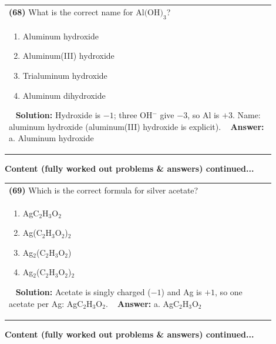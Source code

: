 \documentclass{article}
\begin{document}
\begin{tabular}{|p{0.9\linewidth}|}
\hline
\vspace{0.2cm}
\textbf{(68)} What is the correct name for $\text{Al(OH)}_3$? \\
\begin{minipage}[t]{0.85\linewidth}
\begin{enumerate}[label=\alph*.]
\item Aluminum hydroxide \
\item Aluminum(III) hydroxide \
\item Trialuminum hydroxide \
\item Aluminum dihydroxide
\end{enumerate}
\end{minipage}\
\hline
\vspace{0.2cm}
\textbf{Solution:} Hydroxide is $-1$; three OH$^-$ give $-3$, so Al is $+3$. Name: aluminum hydroxide (aluminum(III) hydroxide is explicit). \
\hline
\vspace{0.2cm}
\textbf{Answer:} a. Aluminum hydroxide \
\hline
\end{tabular}
\newpage
\noindent
{\large\textbf{Content (fully worked out problems & answers) continued...}}\\[0.2em]
\begin{tabular}{|p{0.9\linewidth}|}
\hline
\vspace{0.2cm}
\textbf{(69)} Which is the correct formula for silver acetate? \\
\begin{minipage}[t]{0.85\linewidth}
\begin{enumerate}[label=\alph*.]
\item AgC$_2$H$_3$O$_2$ \
\item Ag(C$_2$H$_3$O$_2$)$_2$ \
\item Ag$_2$(C$_2$H$_3$O$_2$) \
\item Ag$_2$(C$_2$H$_3$O$_2$)$_2$
\end{enumerate}
\end{minipage}\
\hline
\vspace{0.2cm}
\textbf{Solution:} Acetate is singly charged ($-1$) and Ag is $+1$, so one acetate per Ag: AgC$_2$H$_3$O$_2$. \
\hline
\vspace{0.2cm}
\textbf{Answer:} a. AgC$_2$H$_3$O$_2$ \
\hline
\end{tabular}
\newpage
\noindent
{\large\textbf{Content (fully worked out problems & answers) continued...}}\\[0.2em]
\end{document}
